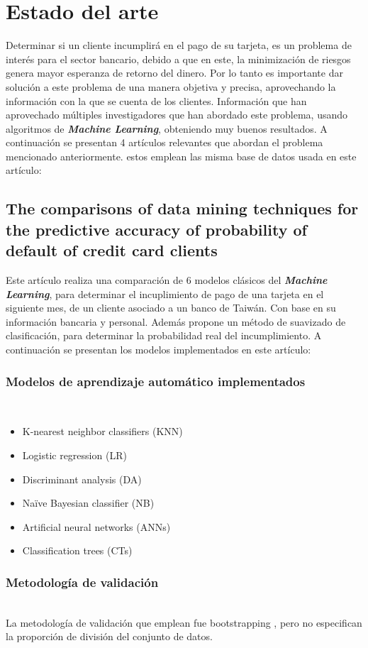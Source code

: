 \documentclass[conference]{IEEEtran}
\begin{document}
\section{Estado del arte}
Determinar si un cliente incumplirá en el pago de su tarjeta, es un problema de interés para el sector bancario, debido a que en este, la minimización de riesgos genera mayor esperanza de retorno del dinero. Por lo tanto es importante dar solución a este problema de una manera objetiva y precisa, aprovechando la información con la que se cuenta de los clientes. Información que han aprovechado múltiples investigadores que han abordado este problema, usando algoritmos de \textit{\textbf{Machine Learning}}, obteniendo muy buenos resultados.
A continuación se presentan 4 artículos relevantes que abordan el problema mencionado anteriormente. estos emplean las misma base de datos usada en este artículo:
\subsection{The comparisons of data mining techniques for the predictive accuracy of probability of default of credit card clients }\label{AA} 
Este artículo  \cite{articulo1}  realiza una comparación de 6 modelos clásicos del \textit{\textbf{Machine Learning}}, para determinar el incuplimiento de pago de una tarjeta en el siguiente mes, de un cliente asociado a un banco de Taiwán. Con base en su información bancaria y personal. Además propone un método de suavizado de clasificación, para determinar la probabilidad real del incumplimiento.
A continuación se presentan los modelos implementados en este artículo:

\subsubsection{Modelos de aprendizaje automático implementados} \hfill\\
\begin{itemize}
\item K-nearest neighbor classifiers (KNN)
\item Logistic regression (LR)
\item Discriminant analysis (DA)
\item Naïve Bayesian classifier (NB)
\item Artificial neural networks (ANNs)
\item Classification trees (CTs)

\end{itemize}
\subsubsection{Metodología de validación} \hfill\\
La metodología de validación que emplean fue bootstrapping \cite{boostrap}, pero no especifican la proporción de división del conjunto de datos.
\end{document}
